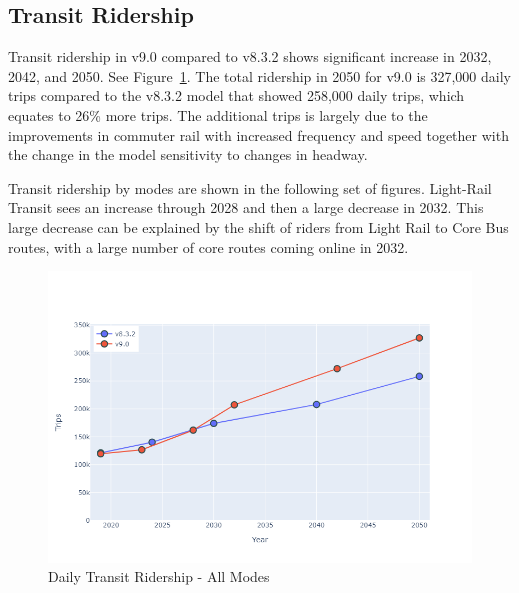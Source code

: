\documentclass[
  letterpaper,
  DIV=11,
  numbers=noendperiod,
  titlepage=false]{scrreprt}
\begin{document}
\hypertarget{transit-ridership}{%
\subsection{Transit Ridership}\label{transit-ridership}}

Transit ridership in v9.0 compared to v8.3.2 shows significant increase
in 2032, 2042, and 2050. See Figure~\ref{fig-pdf-hy-tr-all}. The total
ridership in 2050 for v9.0 is 327,000 daily trips compared to the v8.3.2
model that showed 258,000 daily trips, which equates to 26\% more trips.
The additional trips is largely due to the improvements in commuter rail
with increased frequency and speed together with the change in the model
sensitivity to changes in headway.

Transit ridership by modes are shown in the following set of figures.
Light-Rail Transit sees an increase through 2028 and then a large
decrease in 2032. This large decrease can be explained by the shift of
riders from Light Rail to Core Bus routes, with a large number of core
routes coming online in 2032.

\begin{figure}[H]

{\centering \includegraphics{v9x/v900/whats-new/_pictures/pdf-hy-tr-all.png}

}

\caption{\label{fig-pdf-hy-tr-all}Daily Transit Ridership - All Modes}

\end{figure}
\end{document}
